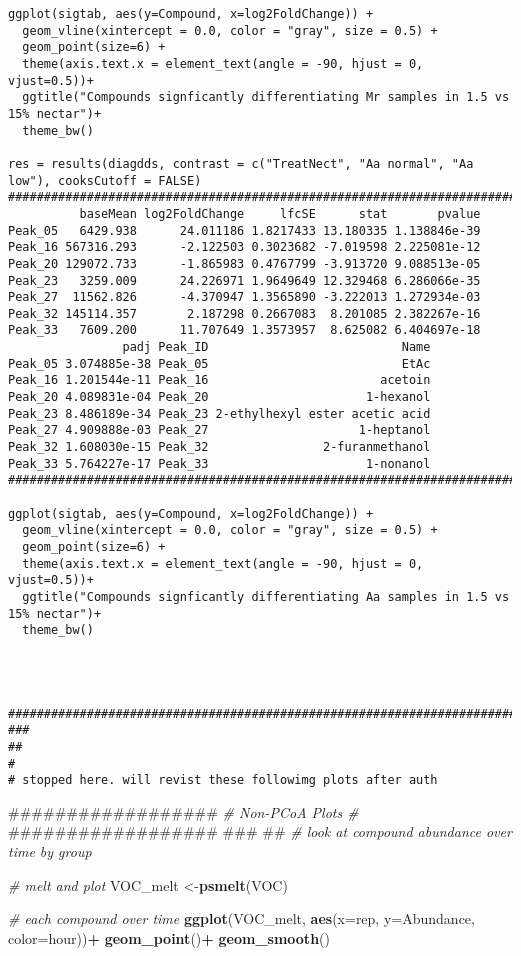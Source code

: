 \documentclass[]{article}
\newenvironment{Shaded}{\begin{snugshade}}{\end{snugshade}}
\newcommand{\KeywordTok}[1]{\textcolor[rgb]{0.13,0.29,0.53}{\textbf{#1}}}
\newcommand{\DataTypeTok}[1]{\textcolor[rgb]{0.13,0.29,0.53}{#1}}
\newcommand{\StringTok}[1]{\textcolor[rgb]{0.31,0.60,0.02}{#1}}
\newcommand{\CommentTok}[1]{\textcolor[rgb]{0.56,0.35,0.01}{\textit{#1}}}
\newcommand{\OperatorTok}[1]{\textcolor[rgb]{0.81,0.36,0.00}{\textbf{#1}}}
\newcommand{\NormalTok}[1]{#1}
\begin{document}
\begin{verbatim}
ggplot(sigtab, aes(y=Compound, x=log2FoldChange)) + 
  geom_vline(xintercept = 0.0, color = "gray", size = 0.5) +
  geom_point(size=6) + 
  theme(axis.text.x = element_text(angle = -90, hjust = 0, vjust=0.5))+
  ggtitle("Compounds signficantly differentiating Mr samples in 1.5 vs 15% nectar")+
  theme_bw()

res = results(diagdds, contrast = c("TreatNect", "Aa normal", "Aa low"), cooksCutoff = FALSE)
################################################################################################3
          baseMean log2FoldChange     lfcSE      stat       pvalue
Peak_05   6429.938      24.011186 1.8217433 13.180335 1.138846e-39
Peak_16 567316.293      -2.122503 0.3023682 -7.019598 2.225081e-12
Peak_20 129072.733      -1.865983 0.4767799 -3.913720 9.088513e-05
Peak_23   3259.009      24.226971 1.9649649 12.329468 6.286066e-35
Peak_27  11562.826      -4.370947 1.3565890 -3.222013 1.272934e-03
Peak_32 145114.357       2.187298 0.2667083  8.201085 2.382267e-16
Peak_33   7609.200      11.707649 1.3573957  8.625082 6.404697e-18
                padj Peak_ID                           Name
Peak_05 3.074885e-38 Peak_05                           EtAc
Peak_16 1.201544e-11 Peak_16                        acetoin
Peak_20 4.089831e-04 Peak_20                      1-hexanol
Peak_23 8.486189e-34 Peak_23 2-ethylhexyl ester acetic acid
Peak_27 4.909888e-03 Peak_27                     1-heptanol
Peak_32 1.608030e-15 Peak_32                2-furanmethanol
Peak_33 5.764227e-17 Peak_33                      1-nonanol
##################################################################################################

ggplot(sigtab, aes(y=Compound, x=log2FoldChange)) + 
  geom_vline(xintercept = 0.0, color = "gray", size = 0.5) +
  geom_point(size=6) + 
  theme(axis.text.x = element_text(angle = -90, hjust = 0, vjust=0.5))+
  ggtitle("Compounds signficantly differentiating Aa samples in 1.5 vs 15% nectar")+
  theme_bw()




#############################################################################################
###
##
#
# stopped here. will revist these followimg plots after auth 
\end{verbatim}

\begin{Shaded}
\begin{Highlighting}[]
\NormalTok{################## }
\CommentTok{# Non-PCoA Plots #}
\NormalTok{##################}
\NormalTok{###}
\NormalTok{##}
\CommentTok{# look at compound abundance over time by group}

\CommentTok{# melt and plot}
\NormalTok{VOC_melt <-}\KeywordTok{psmelt}\NormalTok{(VOC)}

\CommentTok{# each compound over time}
\KeywordTok{ggplot}\NormalTok{(VOC_melt, }\KeywordTok{aes}\NormalTok{(}\DataTypeTok{x=}\NormalTok{rep, }\DataTypeTok{y=}\NormalTok{Abundance, }\DataTypeTok{color=}\NormalTok{hour))}\OperatorTok{+}
\StringTok{  }\KeywordTok{geom_point}\NormalTok{()}\OperatorTok{+}
\StringTok{  }\KeywordTok{geom_smooth}\NormalTok{()}
\end{Highlighting}
\end{Shaded}
\end{document}
